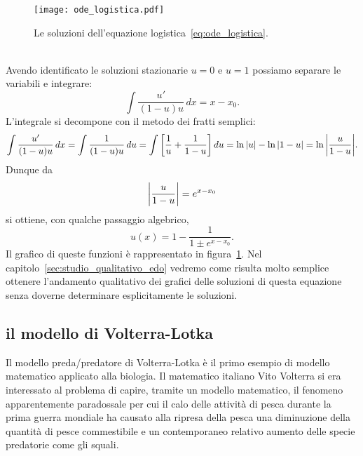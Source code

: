 \newsavebox{\qrOdeLogistica}
\begin{figure}
  \texttt{[image: ode\_logistica.pdf]}
  \caption{
Le soluzioni dell'equazione logistica~\eqref{eq:ode_logistica}.
\ifwidemargin\\\\\fi%
\usebox{\qrOdeLogistica}}
\label{fig:ode_logistica}
\end{figure}

Avendo identificato le soluzioni stazionarie $u=0$ e $u=1$ possiamo separare le variabili
e integrare:
\[
 \int \frac{u'}{(1-u)u}\, dx = x - x_0.
\]
L'integrale si decompone con il metodo dei fratti semplici:
\[
  \int \frac{u'}{(1-u)u}\, dx
  = \int \frac{1}{(1-u)u}\, du 
  = \int {\left[ \frac{1}{u} + \frac{1}{1-u} \right]}\, du 
  = \ln {\left|u\right|} - \ln{\left|1-u\right|}
  = \ln {\left|\frac{u}{1-u}\right|}.
\]
Dunque da 
\[
{\left|\frac{u}{1-u}\right|} = e^{x-x_0}  
\]
si ottiene, con qualche passaggio algebrico,
\[
    u(x) = 1 - \frac{1}{1\pm e^{x-x_0}}.
\]
Il grafico di queste funzioni è rappresentato in figura~\ref{fig:ode_logistica}.
Nel capitolo~\ref{sec:studio_qualitativo_edo}
vedremo come risulta molto semplice ottenere l'andamento qualitativo dei grafici 
delle soluzioni di questa equazione senza doverne determinare esplicitamente 
le soluzioni.

\subsection{il modello di Volterra-Lotka}
%
%
%
%

Il modello preda/predatore di Volterra-Lotka è il primo esempio 
di modello matematico applicato alla biologia.
%
Il matematico italiano Vito Volterra si era interessato al problema 
di capire, tramite un modello matematico, il fenomeno apparentemente 
paradossale per cui il calo delle attività di pesca 
durante la prima guerra mondiale ha causato alla ripresa della pesca 
una diminuzione della 
quantità di pesce commestibile e un contemporaneo relativo aumento delle 
specie predatorie come gli squali.

